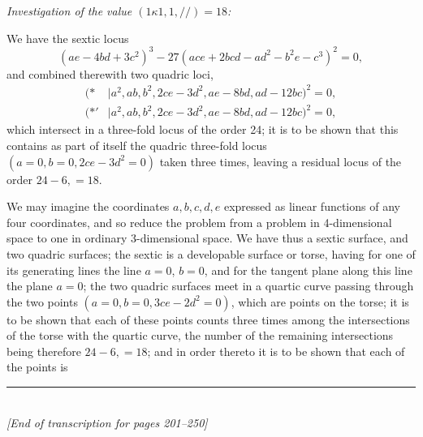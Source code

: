 \documentclass[12pt,a4paper]{article}
\begin{document}
\smallskip
\noindent\textit{Investigation of the value $(1\kappa 1, 1, //) = 18$:}

\smallskip

We have the sextic locus
\[
(ae - 4bd + 3c^2)^3 - 27(ace + 2bcd - ad^2 - b^2e - c^3)^2 = 0,
\]
and combined therewith two quadric loci,
\begin{align*}
(\ast &\mid a^2, ab, b^2, 2ce - 3d^2, ae - 8bd, ad - 12bc)^2 = 0,\\
(\ast' &\mid a^2, ab, b^2, 2ce - 3d^2, ae - 8bd, ad - 12bc)^2 = 0,
\end{align*}
which intersect in a three-fold locus of the order 24; it is to be shown that this contains as part of itself the quadric three-fold locus $(a = 0, b = 0, 2ce - 3d^2 = 0)$ taken three times, leaving a residual locus of the order $24 - 6, = 18$.

We may imagine the coordinates $a, b, c, d, e$ expressed as linear functions of any four coordinates, and so reduce the problem from a problem in 4-dimensional space to one in ordinary 3-dimensional space. We have thus a sextic surface, and two quadric surfaces; the sextic is a developable surface or torse, having for one of its generating lines the line $a = 0$, $b = 0$, and for the tangent plane along this line the plane $a = 0$; the two quadric surfaces meet in a quartic curve passing through the two points $(a = 0, b = 0, 3ce - 2d^2 = 0)$, which are points on the torse; it is to be shown that each of these points counts three times among the intersections of the torse with the quartic curve, the number of the remaining intersections being therefore $24 - 6, = 18$; and in order thereto it is to be shown that each of the points is

\bigskip
\begin{center}
\rule{0.5\textwidth}{0.4pt}\\[0.5em]
\textit{[End of transcription for pages 201--250]}
\end{center}
\end{document}
